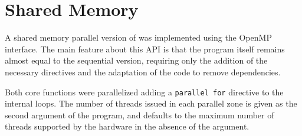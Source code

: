 \section{Shared Memory}
\label{sec:omp}

A shared memory parallel version of \polu was implemented using the OpenMP interface. The main feature about this API is that the program itself remains almost equal to the sequential version, requiring only the addition of the necessary directives and the adaptation of the code to remove dependencies.

Both core functions were parallelized adding a \texttt{parallel for} directive to the internal loops. The number of threads issued in each parallel zone is given as the second argument of the program, and defaults to the maximum number of threads supported by the hardware in the absence of the argument.



